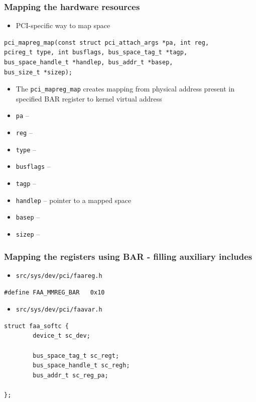 \documentclass[dvipsnames,table]{beamer}
\begin{document}
\begin{frame}[fragile]
\frametitle{Mapping the hardware resources}

\begin{itemize}
	\item PCI-specific way to map space
\end{itemize}

\begin{verbatim}
pci_mapreg_map(const struct pci_attach_args *pa, int reg, 
pcireg_t type, int busflags, bus_space_tag_t *tagp, 
bus_space_handle_t *handlep, bus_addr_t *basep, 
bus_size_t *sizep);
\end{verbatim}

\begin{itemize}
	\item The {\tt pci\_mapreg\_map} creates mapping from physical address present in specified BAR register to kernel virtual address
    \item {\tt pa} --
    \item {\tt reg} -- 
   	\item {\tt type} --
	\item {\tt busflags} -- 
	\item {\tt tagp} -- 
	\item {\tt handlep} -- pointer to a mapped space
	\item {\tt basep} -- 
	\item {\tt sizep} -- 
\end{itemize}
\end{frame}

\begin{frame}[fragile]
\frametitle{Mapping the registers using BAR - filling auxiliary includes}
\scriptsize
\begin{itemize}
	\item {\tt src/sys/dev/pci/faareg.h}
\end{itemize}
\begin{verbatim}
#define FAA_MMREG_BAR   0x10
\end{verbatim}
\begin{itemize}
	\item {\tt src/sys/dev/pci/faavar.h}
\end{itemize}
\begin{verbatim}
struct faa_softc {
        device_t sc_dev;

        bus_space_tag_t sc_regt;
        bus_space_handle_t sc_regh;
        bus_addr_t sc_reg_pa;

};
\end{verbatim}
\end{frame}
\end{document}
